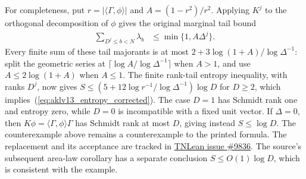 \documentclass{article}
\begin{document}
For completeness, put $r=|\langle\Gamma,\phi\rangle|$ and
$A=(1-r^2)/r^2$. Applying $K^j$ to the orthogonal decomposition of $\phi$
gives the original marginal tail bound
\begin{align}
    \sum_{D^j\le b<N}\lambda_b
     & \le\min\{1,A\Delta^j\}.
    \label{eq:aklv13_entropy_corrected_tails}
\end{align}
Every finite sum of these tail majorants is at most
$2+3\log(1+A)/\log\Delta^{-1}$: split the geometric series at
$\lceil\log A/\log\Delta^{-1}\rceil$ when $A>1$, and use
$A\le2\log(1+A)$ when $A\le1$.
The finite rank-tail entropy inequality, with ranks $D^j$, now gives
$S\le(5+12\log r^{-1}/\log\Delta^{-1})\log D$ for $D\ge2$,
which implies~(\ref{eq:aklv13_entropy_corrected}).
The case $D=1$ has Schmidt rank one and entropy zero, while $D=0$ is
incompatible with a fixed unit vector.
If $\Delta=0$, then $K\phi=\langle\Gamma,\phi\rangle\Gamma$
has Schmidt rank at most $D$, giving instead $S\le\log D$.
The counterexample above remains a counterexample to the printed formula.
The replacement and its acceptance are tracked in
\href{https://github.com/LionSR/TNLean/issues/9836}{TNLean issue \#9836}. The source's subsequent area-law corollary has
a separate conclusion $S\le O(1)\log D$, which is consistent with the
example.



\end{document}

